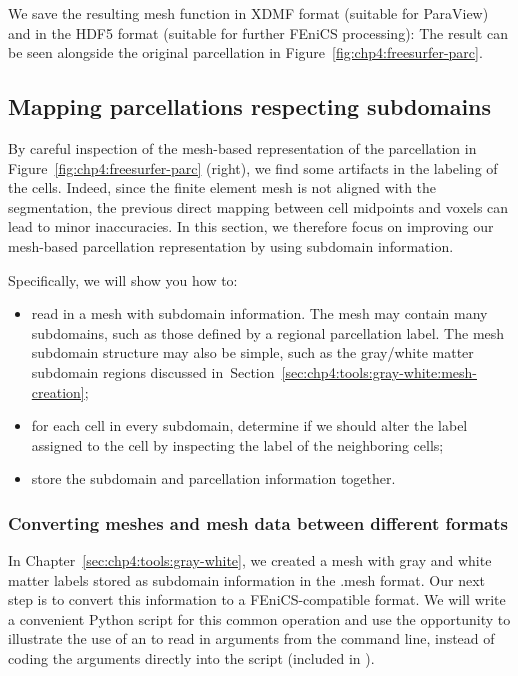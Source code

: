 We save the resulting mesh function in XDMF format (suitable for
ParaView) and in the HDF5 format (suitable for further FEniCS processing): 
The result can be seen alongside the original parcellation in
Figure~\ref{fig:chp4:freesurfer-parc}.

\subsection{Mapping parcellations respecting subdomains}
\label{chp4:parcellations}

By careful inspection of the mesh-based representation of the
parcellation in Figure~\ref{fig:chp4:freesurfer-parc} (right), we find
some artifacts in the labeling of the cells. Indeed, since the finite
element mesh is not aligned with the segmentation, the previous direct
mapping between cell midpoints and voxels can lead to minor
inaccuracies. In this section, we therefore focus on improving our
mesh-based parcellation representation by using subdomain information.

Specifically, we will show you how to:
\begin{itemize}
\item
  read in a mesh with subdomain information. The mesh may contain many
  subdomains, such as those defined by a regional parcellation
  label. The mesh subdomain structure may also be simple, such as the
  gray/white matter subdomain regions discussed
  in~Section~\ref{sec:chp4:tools:gray-white:mesh-creation};
\item
  for each cell in every subdomain, determine if we should alter the label 
  assigned to the cell by inspecting the label of the neighboring cells;
\item
  store the subdomain and parcellation information together.
\end{itemize}

\subsubsection*{Converting meshes and mesh data between different formats} 
\label{chp4:meshio-converting}

In Chapter~\ref{sec:chp4:tools:gray-white}, we created a mesh with
gray and white matter labels stored as subdomain information in the
.mesh format. Our next step is to convert this information to a
FEniCS-compatible format. We will write a convenient Python script for this
common operation and use the opportunity to illustrate the use of an
 to read in arguments from the command
line, instead of coding the arguments directly into the script
(included in ).

